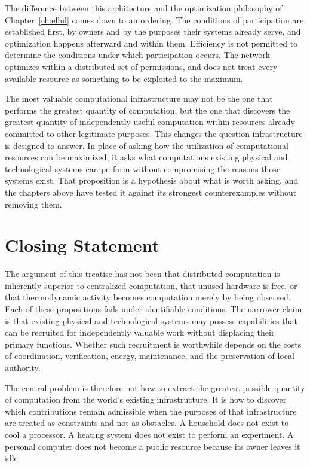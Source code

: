 The difference between this architecture and the optimization philosophy of Chapter~\ref{ch:ellul} comes down to an ordering. The conditions of participation are established first, by owners and by the purposes their systems already serve, and optimization happens afterward and within them. Efficiency is not permitted to determine the conditions under which participation occurs. The network optimizes within a distributed set of permissions, and does not treat every available resource as something to be exploited to the maximum.

The most valuable computational infrastructure may not be the one that performs the greatest quantity of computation, but the one that discovers the greatest quantity of independently useful computation within resources already committed to other legitimate purposes. This changes the question infrastructure is designed to answer. In place of asking how the utilization of computational resources can be maximized, it asks what computations existing physical and technological systems can perform without compromising the reasons those systems exist. That proposition is a hypothesis about what is worth asking, and the chapters above have tested it against its strongest counterexamples without removing them.

\section{Closing Statement}

The argument of this treatise has not been that distributed computation is inherently superior to centralized computation, that unused hardware is free, or that thermodynamic activity becomes computation merely by being observed. Each of these propositions fails under identifiable conditions. The narrower claim is that existing physical and technological systems may possess capabilities that can be recruited for independently valuable work without displacing their primary functions. Whether such recruitment is worthwhile depends on the costs of coordination, verification, energy, maintenance, and the preservation of local authority.

The central problem is therefore not how to extract the greatest possible quantity of computation from the world's existing infrastructure. It is how to discover which contributions remain admissible when the purposes of that infrastructure are treated as constraints and not as obstacles. A household does not exist to cool a processor. A heating system does not exist to perform an experiment. A personal computer does not become a public resource because its owner leaves it idle.


